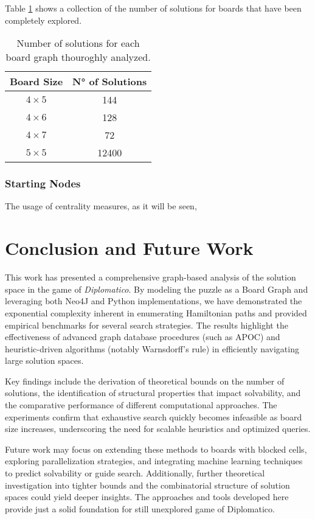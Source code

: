 \documentclass[conference]{IEEEtran}
\begin{document}
Table \ref{tab:sols} shows a collection of the number of solutions for boards that have been completely explored.

\begin{table}[ht]
	\centering
	\begin{tabular}{|c|c|}
		\hline
		\textbf{Board Size} & \textbf{N° of Solutions} \\ \hline
		\textbf{$4 \times 5$} & 144	\\ \hline
		\textbf{$4 \times 6$} & 128	\\ \hline
		\textbf{$4 \times 7$} & 72  \\ \hline
		\textbf{$5 \times 5$} & 12400 \\ \hline 
	\end{tabular}
	\caption{Number of solutions for each board graph thouroghly analyzed.}
	\label{tab:sols}
\end{table}

\subsubsection{Starting Nodes}
The usage of centrality measures, as it will be seen, 

\section{Conclusion and Future Work}
This work has presented a comprehensive graph-based analysis of the solution space in the game of \textit{Diplomatico}. By modeling the puzzle as a Board Graph and leveraging both Neo4J and Python implementations, we have demonstrated the exponential complexity inherent in enumerating Hamiltonian paths and provided empirical benchmarks for several search strategies. The results highlight the effectiveness of advanced graph database procedures (such as APOC) and heuristic-driven algorithms (notably Warnsdorff's rule) in efficiently navigating large solution spaces. 

Key findings include the derivation of theoretical bounds on the number of solutions, the identification of structural properties that impact solvability, and the comparative performance of different computational approaches. The experiments confirm that exhaustive search quickly becomes infeasible as board size increases, underscoring the need for scalable heuristics and optimized queries.

Future work may focus on extending these methods to boards with blocked cells, exploring parallelization strategies, and integrating machine learning techniques to predict solvability or guide search. Additionally, further theoretical investigation into tighter bounds and the combinatorial structure of solution spaces could yield deeper insights. The approaches and tools developed here provide just a solid foundation for still unexplored game of Diplomatico.
\end{document}
